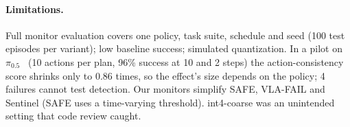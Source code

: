 \documentclass{article}
\begin{document}
\paragraph{Limitations.} Full monitor evaluation covers one policy, task suite, schedule and seed
(100 test episodes per variant); low baseline success; simulated quantization. In a pilot on
$\pi_{0.5}$~\citep{pi05} (10 actions per plan, 96\% success at 10 and 2 steps) the action-consistency
score shrinks only to 0.86 times, so the effect's size depends on the policy; 4 failures cannot test
detection. Our monitors simplify SAFE, VLA-FAIL and Sentinel (SAFE uses a time-varying threshold).
int4-coarse was an unintended setting that code review caught.



\end{document}
